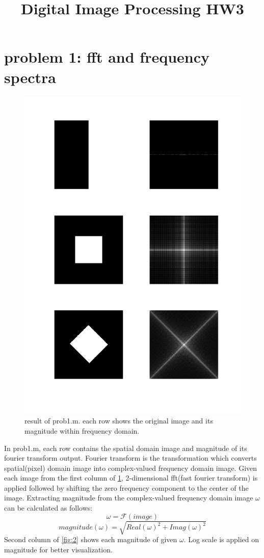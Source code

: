 \documentclass[extendedabs]{bmvc2k}
\begin{document}
\title{Digital Image Processing HW3}

\maketitle
\vspace{-0.2in}

\section*{problem 1: fft and frequency spectra}

\begin{figure}[h]
    \centering
    \includegraphics[width=0.7\linewidth]{hw3_1_1}
    \caption{result of prob1.m. each row shows the original image and its magnitude 
    within frequency domain.}
    \label{fig:1}
\end{figure}

In prob1.m, each row contains the spatial domain image and magnitude of its fourier transform output. 
Fourier transform is the transformation which converts spatial(pixel) domain image into complex-valued 
frequency domain image.
Given each image from the first column of \figurename{\ref{fig:1}}, 2-dimensional fft(fast fourier transform)
is applied followed by shifting the zero frequency component to the center of the image.
Extracting magnitude from the complex-valued frequency domain image $\omega$ can be calculated as follows:
\[\omega = \mathcal{F}(image)\]
\[magnitude(\omega) = \sqrt{Real(\omega)^2 + Imag(\omega)^2}\]
Second column of \figurename{\ref{fig:2}} shows each magnitude of given $\omega$. Log scale is applied on
magnitude for better visualization.
\end{document}
